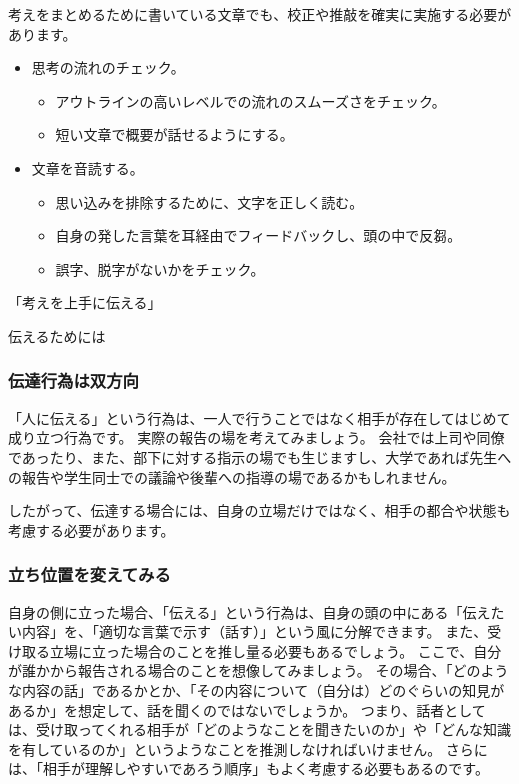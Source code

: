 \documentclass[12pt,a4paper]{jsarticle}
\makeatletter
\def\section{\@startsection 
{section}
{1}
{\z@}
{3.5ex plus -1ex minus -.2ex}
{1.5ex plus .2ex}
{\large\bf}
}
\def\subsection{\@startsection 
{subsection}
{1}
{\z@}
{3.5ex plus -1ex minus -.2ex}
{1.ex plus .2ex}
{\large\bf}
}
\makeatother
\begin{document}
考えをまとめるために書いている文章でも、校正や推敲を確実に実施する必要があります。
\begin{itemize}
\item
思考の流れのチェック。
	\begin{itemize}
	\item
	アウトラインの高いレベルでの流れのスムーズさをチェック。
	\item
	短い文章で概要が話せるようにする。
	\end{itemize}
\item
文章を音読する。
	\begin{itemize}
	\item
	思い込みを排除するために、文字を正しく読む。
	\item
	自身の発した言葉を耳経由でフィードバックし、頭の中で反芻。
	\item
	誤字、脱字がないかをチェック。
	\end{itemize}
\end{itemize}

\section{「考えを上手に伝える」}

\subsection{伝えるためには}

\subsubsection{伝達行為は双方向}

「人に伝える」という行為は、一人で行うことではなく相手が存在してはじめて成り立つ行為です。
実際の報告の場を考えてみましょう。
会社では上司や同僚であったり、また、部下に対する指示の場でも生じますし、大学であれば先生への報告や学生同士での議論や後輩への指導の場であるかもしれません。

したがって、伝達する場合には、自身の立場だけではなく、相手の都合や状態も考慮する必要があります。

\subsubsection{立ち位置を変えてみる}

自身の側に立った場合、「伝える」という行為は、自身の頭の中にある「伝えたい内容」を、「適切な言葉で示す（話す）」という風に分解できます。
また、受け取る立場に立った場合のことを推し量る必要もあるでしょう。
ここで、自分が誰かから報告される場合のことを想像してみましょう。
その場合、「どのような内容の話」であるかとか、「その内容について（自分は）どのぐらいの知見があるか」を想定して、話を聞くのではないでしょうか。
つまり、話者としては、受け取ってくれる相手が「どのようなことを聞きたいのか」や「どんな知識を有しているのか」というようなことを推測しなければいけません。
さらには、「相手が理解しやすいであろう順序」もよく考慮する必要もあるのです。
\end{document}
